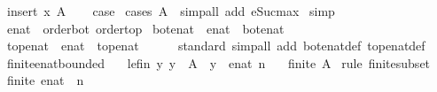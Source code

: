 \begin{isabellebody}
\ {\isacharparenleft}insert\ x\ A{\isacharparenright}\isanewline
\ \ \isamarkupfalse%
\ {\isacharquery}case\ \isamarkupfalse%
{\isacharparenleft}cases\ {\isachardoublequoteopen}A\ {\isacharequal}\ {\isacharbraceleft}{\isacharbraceright}{\isachardoublequoteclose}{\isacharparenright}{\isacharparenleft}simp{\isacharunderscore}all\ add{\isacharcolon}\ eSuc{\isacharunderscore}max{\isacharparenright}\isanewline
{}\isamarkupfalse%
\ simp%
\endisatagproof
{\isafoldproof}%
%
\isadelimproof
\isanewline
%
\endisadelimproof
\isanewline
{}\isamarkupfalse%
\ enat\ {\isacharcolon}{\isacharcolon}\ {\isachardoublequoteopen}{\isacharbraceleft}order{\isacharunderscore}bot{\isacharcomma}\ order{\isacharunderscore}top{\isacharbraceright}{\isachardoublequoteclose}\isanewline
{}\isanewline
\isanewline
{}\isamarkupfalse%
\ bot{\isacharunderscore}enat\ {\isacharcolon}{\isacharcolon}\ enat\ \ {\isachardoublequoteopen}bot{\isacharunderscore}enat\ {\isacharequal}\ {}{\isachardoublequoteclose}\isanewline
{}\isamarkupfalse%
\ top{\isacharunderscore}enat\ {\isacharcolon}{\isacharcolon}\ enat\ \ {\isachardoublequoteopen}top{\isacharunderscore}enat\ {\isacharequal}\ {\isasyminfinity}{\isachardoublequoteclose}\isanewline
\isanewline
{}\isamarkupfalse%
\isanewline
%
\isadelimproof
\ \ %
\endisadelimproof
%
\isatagproof
{}\isamarkupfalse%
\ standard\ {\isacharparenleft}simp{\isacharunderscore}all\ add{\isacharcolon}\ bot{\isacharunderscore}enat{\isacharunderscore}def\ top{\isacharunderscore}enat{\isacharunderscore}def{\isacharparenright}%
\endisatagproof
{\isafoldproof}%
%
\isadelimproof
\isanewline
%
\endisadelimproof
\isanewline
{}\isamarkupfalse%
\isanewline
\isanewline
{}\isamarkupfalse%
\ finite{\isacharunderscore}enat{\isacharunderscore}bounded{\isacharcolon}\isanewline
\ \ \ le{\isacharunderscore}fin{\isacharcolon}\ {\isachardoublequoteopen}{\isasymAnd}y{\isachardot}\ y\ {\isasymin}\ A\ {\isasymLongrightarrow}\ y\ {\isasymle}\ enat\ n{\isachardoublequoteclose}\isanewline
\ \ \ {\isachardoublequoteopen}finite\ A{\isachardoublequoteclose}\isanewline
%
\isadelimproof
%
\endisadelimproof
%
\isatagproof
{}\isamarkupfalse%
\ {\isacharparenleft}rule\ finite{\isacharunderscore}subset{\isacharparenright}\isanewline
\ \ \isamarkupfalse%
\ {\isachardoublequoteopen}finite\ {\isacharparenleft}enat\ {\isacharbackquote}\ {\isacharbraceleft}{\isachardot}{\isachardot}n{\isacharbraceright}{\isacharparenright}{\isachardoublequoteclose}\ \isamarkupfalse%

\end{isabellebody}
